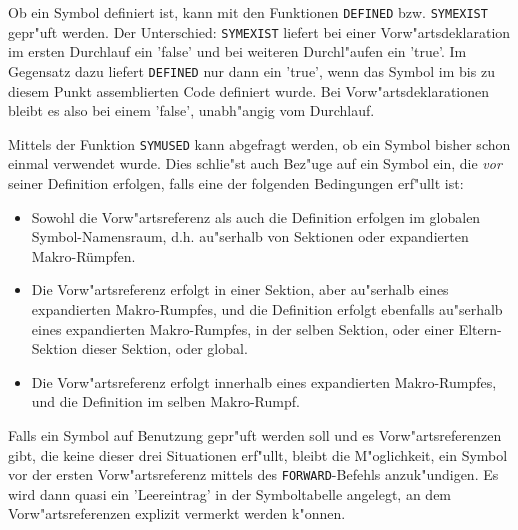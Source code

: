 \documentclass[12pt,a4paper,twoside]{report}
\newcommand{\tty}[1]{{\tt #1}}
\begin{document}
Ob ein Symbol definiert ist, kann mit den Funktionen \tty{DEFINED} bzw.
\tty{SYMEXIST} gepr"uft werden.  Der Unterschied: \tty{SYMEXIST} liefert
bei einer Vorw"artsdeklaration im ersten Durchlauf ein 'false' und bei
weiteren Durchl"aufen ein 'true'.  Im Gegensatz dazu liefert \tty{DEFINED} nur
dann ein 'true', wenn das Symbol im bis zu diesem Punkt assemblierten Code
definiert wurde.  Bei Vorw"artsdeklarationen bleibt es also bei einem 'false',
unabh"angig vom Durchlauf.

\label{sect_symused}
Mittels der Funktion \tty{SYMUSED} kann abgefragt werden, ob ein Symbol
bisher schon einmal verwendet wurde.  Dies schlie"st auch Bez"uge auf
ein Symbol ein, die {\em vor} seiner Definition erfolgen, falls
eine der folgenden Bedingungen erf"ullt ist:
\begin{itemize}
\item{Sowohl die Vorw"artsreferenz als auch die Definition erfolgen im
      globalen Symbol-Namensraum, d.h. au"serhalb von Sektionen oder
      expandierten Makro-Rümpfen.}
\item{Die Vorw"artsreferenz erfolgt in einer Sektion, aber au"serhalb
      eines expandierten Makro-Rumpfes, und die Definition erfolgt ebenfalls
      au"serhalb eines expandierten Makro-Rumpfes, in der selben Sektion, oder
      einer Eltern-Sektion dieser Sektion, oder global.}
\item{Die Vorw"artsreferenz erfolgt innerhalb eines expandierten Makro-Rumpfes,
      und die Definition im selben Makro-Rumpf.}
\end{itemize}
Falls ein Symbol auf Benutzung gepr"uft werden soll und es Vorw"artsreferenzen
gibt, die keine dieser drei Situationen erf"ullt, bleibt die M"oglichkeit,
ein Symbol vor der ersten Vorw"artsreferenz mittels des \tty{FORWARD}-Befehls
anzuk"undigen.  Es wird dann quasi ein 'Leereintrag' in der Symboltabelle
angelegt, an dem Vorw"artsreferenzen explizit vermerkt werden k"onnen.
\end{document}
